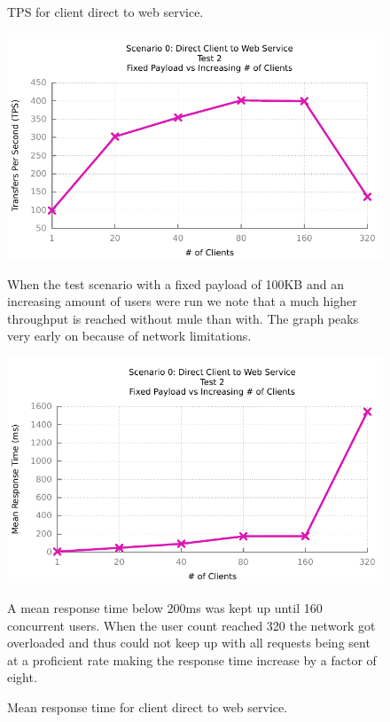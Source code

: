 \begin{figure}[H]
	\caption{TPS for client direct to web service.}
	\centerline{\includegraphics{img/direct_fp_iu_tps}}
	\label{fig:direct-2-1}
	When the test scenario with a fixed payload of 100KB and an increasing amount of users were run we note that a much higher throughput is reached without mule than with. The graph peaks very early on because of network limitations.

	\caption{Mean response time for client direct to web service.}
	\centerline{\includegraphics{img/direct_fp_iu_resp}}
	\label{fig:direct-2-2}
	A mean response time below 200ms was kept up until 160 concurrent users. When the user count reached 320 the network got overloaded and thus could not keep up with all requests being sent at a proficient rate making the response time increase by a factor of eight.
\end{figure}

